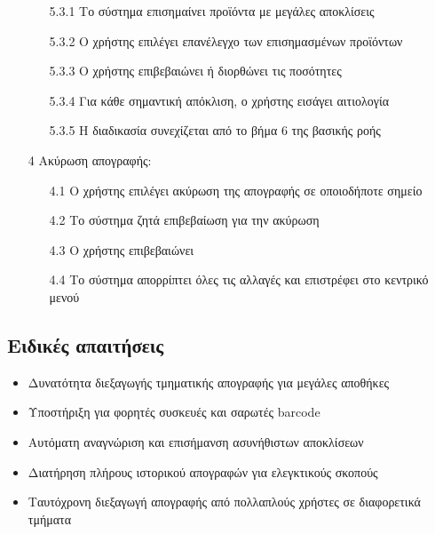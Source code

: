 \documentclass[12pt,a4paper,twoside]{book}
\begin{document}
\begin{enumerate}
        \begin{enumerate}
          \item [5.3.1 ] Tο σύστημα επισημαίνει προϊόντα με μεγάλες αποκλίσεις
          \item [5.3.2 ] Ο χρήστης επιλέγει επανέλεγχο των επισημασμένων προϊόντων
          \item [5.3.3 ] Ο χρήστης επιβεβαιώνει ή διορθώνει τις ποσότητες
          \item [5.3.4 ] Για κάθε σημαντική απόκλιση, ο χρήστης εισάγει αιτιολογία
          \item [5.3.5 ] Η διαδικασία συνεχίζεται από το βήμα 6 της βασικής ροής
        \end{enumerate}
  \item[4 ] Ακύρωση απογραφής:
        \begin{enumerate}
          \item [4.1 ] Ο χρήστης επιλέγει ακύρωση της απογραφής σε οποιοδήποτε σημείο
          \item [4.2 ] Το σύστημα ζητά επιβεβαίωση για την ακύρωση
          \item [4.3 ] Ο χρήστης επιβεβαιώνει
          \item [4.4 ] Το σύστημα απορρίπτει όλες τις αλλαγές και επιστρέφει στο κεντρικό μενού
        \end{enumerate}
\end{enumerate}

\subsection{Ειδικές απαιτήσεις}
\begin{itemize}
  \item Δυνατότητα διεξαγωγής τμηματικής απογραφής για μεγάλες αποθήκες
  \item Υποστήριξη για φορητές συσκευές και σαρωτές barcode
  \item Αυτόματη αναγνώριση και επισήμανση ασυνήθιστων αποκλίσεων
  \item Διατήρηση πλήρους ιστορικού απογραφών για ελεγκτικούς σκοπούς
  \item Ταυτόχρονη διεξαγωγή απογραφής από πολλαπλούς χρήστες σε διαφορετικά τμήματα
\end{itemize}
\end{document}
